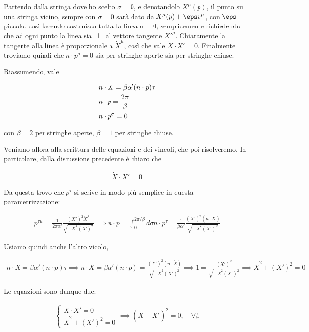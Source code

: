 \documentclass{report}
\begin{document}
Partendo dalla stringa dove ho scelto \(\sigma = 0\), e denotandolo \(X^\mu(p)\), il punto su una stringa vicino, sempre con \(\sigma =0\) sarà dato da \(X^\mu(p) +\eps v^\mu\), con \(\eps\) piccolo: così facendo costruisco tutta la linea \(\sigma=0\), semplicemente richiedendo che ad ogni punto la linea sia \(\perp\) al vettore tangente \(X'^\mu\). Chiaramente la tangente alla linea è proporzionale a \(\dot{X}^\mu\), così che vale \(\dot{X}\cdot X' =0\). Finalmente troviamo quindi che \(n\cdot p^\sigma =0\) sia per stringhe aperte sia per stringhe chiuse. 

Riassumendo, vale 

\begin{align}
    &n\cdot X = \beta \alpha' (n\cdot p)\tau \notag \\
    &n\cdot p = \frac{2\pi}{\beta} \notag \\
    &n\cdot p^\sigma = 0 
\end{align}

con \(\beta =2\) per stringhe aperte, \(\beta = 1\) per stringhe chiuse. 

Veniamo allora alla scrittura delle equazioni e dei vincoli, che poi risolveremo. In particolare, dalla discussione precedente è chiaro che 

\begin{align}
    \dot{X} \cdot X' = 0 
\end{align}

Da questa trovo che \(p^\tau\) si scrive in modo più semplice in questa parametrizzazione: 

\begin{align}
    p^{\tau \mu} = \frac{1}{2\pi \alpha'}\frac{(X')^2\dot{X}^\mu}{\sqrt{-\dot{X}^2(X')^2}} \implies n\cdot p = \int_0^{2\pi/\beta} d\sigma n\cdot p^\tau = \frac{1}{\beta\alpha'}\frac{(X')^2 (n\cdot \dot{X})}{\sqrt{-\dot{X}^2(X')^2}}
\end{align}

Usiamo quindi anche l'altro vicolo, 

\begin{align}
    n \cdot X = \beta \alpha' (n\cdot p)\tau  \implies n\cdot \dot{X} = \beta\alpha' (n\cdot p )  = \frac{(X')^2 (n\cdot \dot{X})}{\sqrt{-\dot{X}^2(X')^2}} \implies 1 = \frac{(X')^2}{\sqrt{-\dot{X}^2 (X')^2}} \implies \dot{X}^2 + (X')^2 = 0 
\end{align}


Le equazioni sono dunque due: 

\begin{align}
    \begin{cases}
        \dot{X}\cdot X' = 0 \\ 
        \dot{X}^2 + (X')^2 = 0
    \end{cases} \implies (\dot{X} \pm X')^2 = 0, \quad \forall \beta
\end{align}
\end{document}
